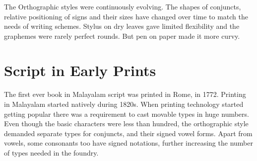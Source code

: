 \documentclass[10pt]{article}
\begin{document}
 The Orthographic styles were continuously evolving. The shapes of conjuncts, relative positioning of signs and their sizes have changed over time to match the needs of writing schemes. Stylus on dry leaves gave limited flexibility and the graphemes were rarely perfect rounds. But pen on paper made it more curvy. 



%
%
%
%
%




\section{Script in Early Prints }


\paragraph{}
The first ever book in Malayalam script was printed in Rome, in 1772. Printing in Malayalam started natively during 1820s. When printing technology started getting popular there was a requirement to cast movable types in huge numbers. Even though the basic characters were less than hundred, the orthographic style demanded separate types for conjuncts, and their signed vowel forms. Apart from vowels, some consonants too have signed notations, further increasing the number of types needed in the foundry. 
\end{document}
